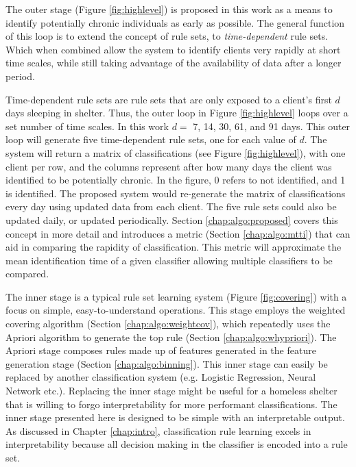 The outer stage (Figure \ref{fig:highlevel}) is proposed in this work as a means to identify potentially chronic individuals as early as possible. The general function of this loop is to extend the concept of rule sets, to \emph{time-dependent} rule sets. Which when combined allow the \Abb system to identify clients very rapidly at short time scales, while still taking advantage of the availability of data after a longer period.

Time-dependent rule sets are rule sets that are only exposed to a client's first $d$ days sleeping in shelter. Thus, the outer loop in Figure \ref{fig:highlevel} loops over a set number of time scales. In this work $d =$ 7, 14, 30, 61, and 91 days. This outer loop will generate five time-dependent rule sets, one for each value of $d$. The \Abb system will return a matrix of classifications (see Figure \ref{fig:highlevel}), with one client per row, and the columns represent after how many days the client was identified to be potentially chronic. In the figure, 0 refers to not identified, and 1 is identified. The proposed system would re-generate the matrix of classifications every day using updated data from each client. The five rule sets could also be updated daily, or updated periodically.
Section \ref{chap:algo:proposed} covers this concept in more detail and introduces a metric (Section \ref{chap:algo:mtti}) that can aid in comparing the rapidity of classification. This metric will approximate the mean identification time of a given classifier allowing multiple classifiers to be compared.

The inner stage is a typical rule set learning system (Figure \ref{fig:covering}) with a focus on simple, easy-to-understand operations. This stage employs the weighted covering algorithm (Section \ref{chap:algo:weightcov}), which repeatedly uses the Apriori algorithm to generate the top rule (Section \ref{chap:algo:whypriori}). The Apriori stage composes rules made up of features generated in the feature generation stage (Section \ref{chap:algo:binning}).
This inner stage can easily be replaced by another classification system (e.g. Logistic Regression, Neural Network etc.). Replacing the inner stage might be useful for a homeless shelter that is willing to forgo interpretability for more performant classifications. The inner stage presented here is designed to be simple with an interpretable output. As discussed in Chapter \ref{chap:intro}, classification rule learning excels in interpretability because all decision making in the classifier is encoded into a rule set.

